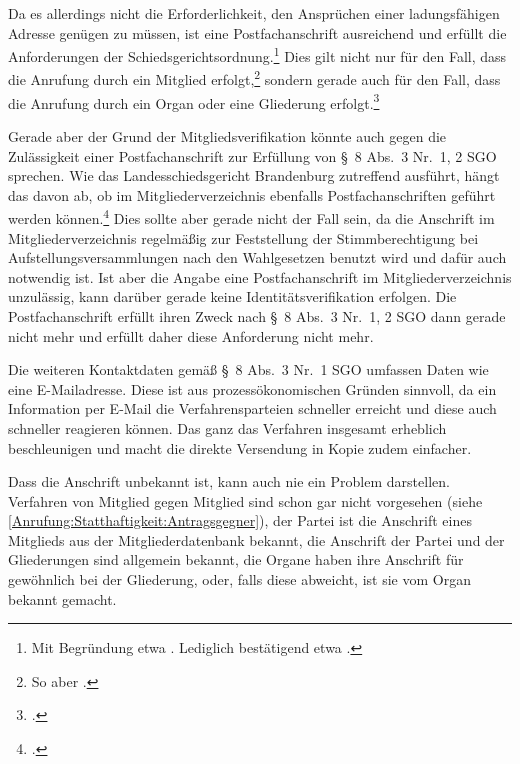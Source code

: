 Da es allerdings nicht die Erforderlichkeit, den Ansprüchen einer ladungsfähigen Adresse genügen zu müssen, ist eine Postfachanschrift ausreichend und erfüllt die Anforderungen der Schiedsgerichtsordnung.\footnote{Mit Begründung etwa \cites[3]{BSG20130715}[S.~4 Rn~16]{LSGBB145}{LSGBB134}. Lediglich bestätigend etwa \cites[7]{LSGBB133}[S.~10~f. Rn~48]{LSGBB146}.}
Dies gilt nicht nur für den Fall, dass die Anrufung durch ein Mitglied erfolgt,\footnote{So aber \cites[S.~1]{LSGBB134}.} sondern gerade auch für den Fall, dass die Anrufung durch ein Organ oder eine Gliederung erfolgt.\footnote{\cites[S.~2~f.]{BSG20131230}.}

Gerade aber der Grund der Mitgliedsverifikation könnte auch gegen die Zulässigkeit einer Postfachanschrift zur Erfüllung von \S~8 Abs.~3 Nr.~1, 2 SGO sprechen.
Wie das Landesschiedsgericht Brandenburg zutreffend ausführt, hängt das davon ab, ob im Mitgliederverzeichnis ebenfalls Postfachanschriften geführt werden können.\footnote{\cites[S.~4 Rn~16]{LSGBB145}.}
Dies sollte aber gerade nicht der Fall sein, da die Anschrift im Mitgliederverzeichnis regelmäßig zur Feststellung der Stimmberechtigung bei Aufstellungsversammlungen nach den Wahlgesetzen benutzt wird und dafür auch notwendig ist.
Ist aber die Angabe eine Postfachanschrift im Mitgliederverzeichnis unzulässig, kann darüber gerade keine Identitätsverifikation erfolgen.
Die Postfachanschrift erfüllt ihren Zweck nach \S~8 Abs.~3 Nr.~1, 2 SGO dann gerade nicht mehr und erfüllt daher diese Anforderung nicht mehr.

Die weiteren Kontaktdaten gemäß \S~8 Abs.~3 Nr.~1 SGO umfassen Daten wie eine E-Mailadresse. Diese ist aus prozessökonomischen Gründen sinnvoll, da ein Information per E-Mail die Verfahrensparteien schneller erreicht und diese auch schneller reagieren können. Das ganz das Verfahren insgesamt erheblich beschleunigen und macht die direkte Versendung in Kopie zudem einfacher.

Dass die Anschrift unbekannt ist, kann auch nie ein Problem darstellen. Verfahren von Mitglied gegen Mitglied sind schon gar nicht vorgesehen (siehe \ref{Anrufung:Statthaftigkeit:Antragsgegner}), der Partei ist die Anschrift eines Mitglieds aus der Mitgliederdatenbank bekannt, die Anschrift der Partei und der Gliederungen sind allgemein bekannt, die Organe haben ihre Anschrift für gewöhnlich bei der Gliederung, oder, falls diese abweicht, ist sie vom Organ bekannt gemacht.

